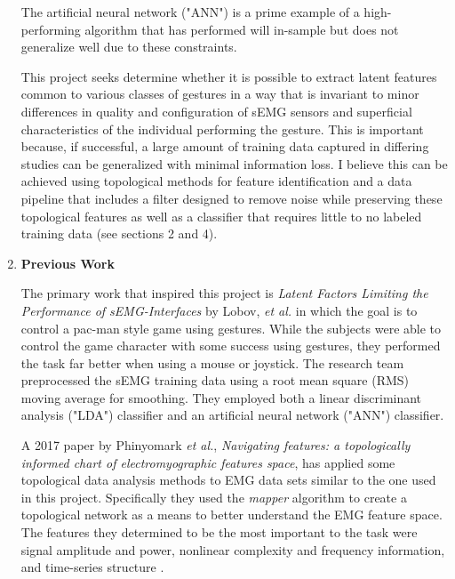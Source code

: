 \documentclass[11pt]{article}
\begin{document}
\begin{enumerate}
The artificial neural network ("ANN") is a prime example of a high-performing algorithm that has performed will in-sample but does not generalize well due to these constraints.

This project seeks determine whether it is possible to extract latent features common to various classes of gestures in a way that is invariant to minor differences in quality and configuration of sEMG sensors and superficial characteristics of the individual performing the gesture. This is important because, if successful, a large amount of training data captured in differing studies can be generalized with minimal information loss. I believe this can be achieved using topological methods for feature identification and a data pipeline that includes a filter designed to remove noise while preserving these topological features as well as a classifier that requires little to no labeled training data (see sections 2 and 4).


\item \textbf{Previous Work}

The primary work that inspired this project is  \emph{Latent Factors Limiting the Performance of sEMG-Interfaces} by Lobov, \emph{et al.} \cite{lobov} in which the goal is to control a pac-man style game using gestures. While the subjects were able to control the game character with some success using gestures, they performed the task far better when using a mouse or joystick. The research team preprocessed the sEMG training data using a root mean square (RMS) moving average for smoothing. They employed both a linear discriminant analysis ("LDA") classifier and an artificial neural network ("ANN") classifier.

A 2017 paper by Phinyomark \emph{et al.}, \emph{Navigating features: a topologically informed chart of electromyographic features space}, has applied some topological data analysis methods to EMG data sets similar to the one used in this project. Specifically they used the \emph{mapper} algorithm to create a topological network as a means to better understand the EMG feature space. The features they determined to be the most important to the task were signal amplitude and power, nonlinear complexity and frequency information, and time-series structure \cite{topograph}.


\end{enumerate}
\end{document}
